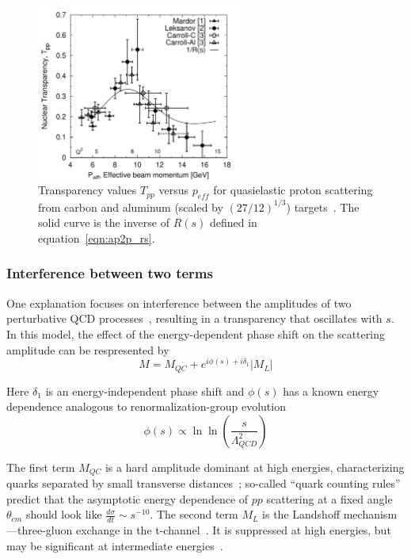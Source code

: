 \begin{figure}[!h]
    \centering
    \includegraphics[width=0.6\textwidth]{chap2/ap2p.pdf}
    \caption{Transparency values $T_{pp}$ versus $p_{eff}$ for quasielastic
             proton scattering from carbon and aluminum (scaled by
             $(27/12)^{1/3}$) targets~\cite{Aclander_2004}.
             The solid curve is the inverse of $R(s)$ defined in
             equation~\ref{eqn:ap2p_rs}.
            }
    \label{fig:ap2p}
\end{figure}

\subsubsection{Interference between two terms}
One explanation focuses on interference between the amplitudes of two
perturbative QCD processes~\cite{Ralston_1988}, resulting in a transparency
that oscillates with $s$.
In this model, the effect of the energy-dependent phase shift on the scattering
amplitude can be respresented by
\begin{equation}
    M = M_{QC} + e^{i\phi(s) + i \delta_1}\left|M_L\right|
\end{equation}

Here $\delta_1$ is an energy-independent phase shift and $\phi(s)$ has a known
energy dependence analogous to renormalization-group
evolution~\cite{Pire_1982, Ralston_1982, Sen_1983}
\begin{equation}
    \phi(s) \propto \ln \ln \left( \frac{s}{\Lambda_{QCD}^2} \right)
\end{equation}


The first term $M_{QC}$ is a hard amplitude dominant at high energies,
characterizing quarks separated by small transverse
distances~\cite{Brodsky_1973, Brodsky_1975, Matveev_1973, Lepage_1980};
so-called ``quark counting rules'' predict that the asymptotic energy
dependence of $pp$ scattering at a fixed angle $\theta_{cm}$ should look like
$\frac{d\sigma}{dt}\sim s^{-10}$.
The second term $M_L$ is the Landshoff mechanism---three-gluon exchange in the
t-channel~\cite{Landshoff_1974, Landshoff_1980}.
It is suppressed at high energies, but may be significant at intermediate
energies~\cite{Mueller_1981}.



